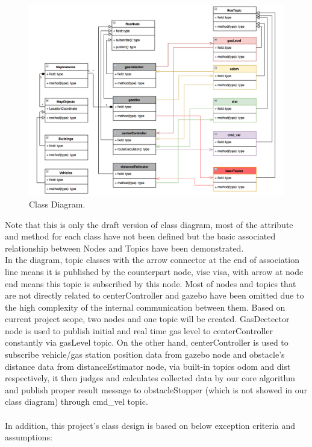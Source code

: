 \documentclass[12pt,onecolumn,titlepage]{article}
\begin{document}
\begin{figure}[H]
  \begin{center}
    \includegraphics[width=1\columnwidth]{4}
  \end{center}
  \caption{\small Class Diagram.}
  \label{fig-label}
\end{figure} \par

\noindent Note that this is only the draft version of class diagram, most of the attribute and method for each class have not been defined but the basic associated relationship between Nodes and Topics have been demonstrated. \\
 
\noindent In the diagram, topic classes with the arrow connector at the end of association line means it is published by the counterpart node, vise visa, with arrow at node end means this topic is subscribed by this node. Most of nodes and topics that are not directly related to centerController and gazebo have been omitted due to the high complexity of the internal communication between them. Based on current project scope, two nodes and one topic will be created. GasDectector node is used to publish initial and real time gas level to centerController constantly via gasLevel topic. On the other hand, centerController is used to subscribe vehicle/gas station position data from gazebo node and obstacle's distance data from distanceEstimator node, via built-in topics odom and dist respectively, it then judges and calculates collected data by our core algorithm and publish proper result message to obstacleStopper (which is not showed in our class diagram) through cmd\_vel topic.\\ 
\\
\noindent In addition, this project's class design is based on below exception criteria and assumptions:\\
 
\end{document}
